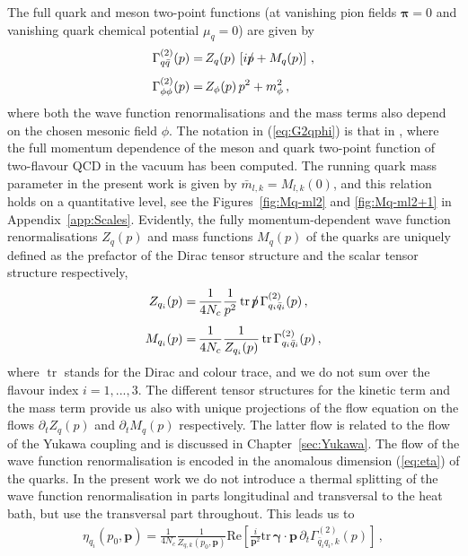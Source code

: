 \documentclass[%
reprint,
superscriptaddress,
showpacs,preprintnumbers,
 amsmath,amssymb,
 aps,
prd,
]{revtex4-1}
\newcommand{\tr}{\ensuremath{\operatorname{tr}}}
\def\eq#1{(\ref{#1})}
\def\app#1{Appendix~\ref{#1}}
\def\pslash{p\llap{/}}
\begin{document}
The full quark and meson two-point functions (at vanishing pion fields
$\bm\pi=0$ and vanishing quark chemical potential $\mu_q=0$) are given
by
%
\begin{align}\nonumber 
  \Gamma^{(2)}_{q\bar q}(p) = &\,Z_{q}(p)\,\left[ i \pslash +
                                M_q(p)\right]\,, \\[1ex]
  \Gamma^{(2)}_{\phi\phi}(p) =&\, Z_{\phi}(p)\,p^2 + m_\phi^2\,, 
  \label{eq:G2qphi}
\end{align}
%
where both the wave function renormalisations and the mass terms also
depend on the chosen mesonic field $\phi$. The notation in
\eq{eq:G2qphi} is that in \cite{Mitter:2014wpa,Cyrol:2017ewj}, where
the full momentum dependence of the meson and quark two-point function
of two-flavour QCD in the vacuum has been computed. The running quark
mass parameter in the present work is given by
$\bar m_{l,k} = M_{l,k}(0)$, and this relation holds on a quantitative
level, see the Figures~\ref{fig:Mq-ml2} and \ref{fig:Mq-ml2+1} in
\app{app:Scales}. Evidently, the fully momentum-dependent wave
function renormalisations $Z_q(p)$ and mass functions $M_q(p)$ of the
quarks are uniquely defined as the prefactor of the Dirac tensor
structure and the scalar tensor structure respectively,
%
\begin{align}\nonumber 
  Z_{q_i}(p) =&\,  \frac{1}{4 N_c } \frac{1}{p^2 }\tr\pslash \,
               \Gamma^{(2)}_{q_i\bar q_i}(p)  \,,\\[1ex]
  M_{q_i}(p) = &\, \frac{1}{4 N_c} \frac{1}{Z_{q_i}(p)}
                 \tr\Gamma^{(2)}_{q_i\bar q_i}(p)  \,,
  \label{eq:Z_qM_q}
\end{align}
%
where $\tr$ stands for the Dirac and colour trace, and we do not sum
over the flavour index $i=1,...,3$. The different tensor structures
for the kinetic term and the mass term provide us also with unique
projections of the flow equation on the flows $\partial_t Z_q(p)$ and
$\partial_t M_q(p)$ respectively. The latter flow is related to the
flow of the Yukawa coupling and is discussed in
Chapter~\ref{sec:Yukawa}. The flow of the wave function
renormalisation is encoded in the anomalous dimension \eq{eq:eta} of
the quarks. In the present work we do not introduce a thermal
splitting of the wave function renormalisation in parts longitudinal
and transversal to the heat bath, but use the transversal part
throughout. This leads us to
%
\begin{align}
  \eta_{q_i}(p_0,\bm{p})=\frac{1}{4 N_c}\frac{1}{
  Z_{q,k}(p_0,\bm{p})}\mathrm{Re}
  \left[\frac{i}{\bm{p}^2}\mathrm{tr}
  \, \bm{\gamma}\cdot\bm{p}\,\partial_t
  \Gamma^{(2)}_{\bar q_i q_i,k}(p)\right]\,,
  \label{eq:etapsiGen}
\end{align}
%
\end{document}

